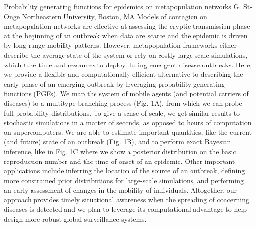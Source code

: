 
    \begin{abstract_online}{Probability generating functions for epidemics on metapopulation networks}{%
        G. St-Onge}{%
        }{%
        Northeastern University, Boston, MA}
    Models of contagion on metapopulation networks are effective at assessing the cryptic transmission phase at the beginning of an outbreak when data are scarce and the epidemic is driven by long-range mobility patterns. However, metapopulation frameworks either describe the average state of the system or rely on costly large-scale simulations, which take time and resources to deploy during emergent disease outbreaks. Here, we provide a flexible and computationally efficient alternative to describing the early phase of an emerging outbreak by leveraging probability generating functions (PGFs). We map the system of mobile agents (and potential carriers of diseases) to a multitype branching process (Fig. 1A), from which we can probe full probability distributions. To give a sense of scale, we get similar results to stochastic simulations in a matter of seconds, as opposed to hours of computation on supercomputers. We are able to estimate important quantities, like the current (and future) state of an outbreak (Fig. 1B), and to perform exact Bayesian inference, like in Fig. 1C where we show a posterior distribution on the basic reproduction number and the time of onset of an epidemic. Other important applications include inferring the location of the source of an outbreak, defining more constrained prior distributions for large-scale simulations, and performing an early assessment of changes in the mobility of individuals. Altogether, our approach provides timely situational awareness when the spreading of concerning diseases is detected and we plan to leverage its computational advantage to help design more robust global surveillance systems. 
    
    \end{abstract_online}
    